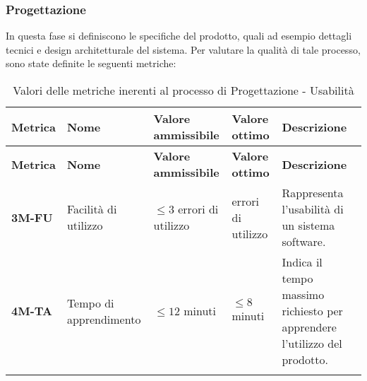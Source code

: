 \subsubsection{Progettazione}
In questa fase si definiscono le specifiche del prodotto, quali ad esempio dettagli tecnici e design architetturale del sistema.
Per valutare la qualità di tale processo, sono state definite le seguenti metriche:
\begin{longtable}{|>{\centering\arraybackslash}p{}|>{\centering\arraybackslash}p{}|>{\centering\arraybackslash}p{}|>{\centering\arraybackslash}p{}|>{\centering\arraybackslash}p{}|}
	\hline
	\textbf{Metrica} & \textbf{Nome}          & \textbf{Valore ammissibile}  & \textbf{Valore ottimo} & \textbf{Descrizione}                                                      \\
	\hline
	\endfirsthead
	\hline
	\textbf{Metrica} & \textbf{Nome}          & \textbf{Valore ammissibile}  & \textbf{Valore ottimo} & \textbf{Descrizione}                                                      \\
	\endhead
	\textbf{3M-FU}   & Facilità di utilizzo   & $\leq 3 $ errori di utilizzo & 0 errori di utilizzo   & Rappresenta l'usabilità di un sistema software.                           \\
	\hline
	\textbf{4M-TA}   & Tempo di apprendimento & $\leq 12 $ minuti            & $\leq 8 $ minuti       & Indica il tempo massimo richiesto per apprendere l'utilizzo del prodotto. \\
	\hline
	\caption{Valori delle metriche inerenti al processo di Progettazione - Usabilità}
	\label{table:2}
\end{longtable}


